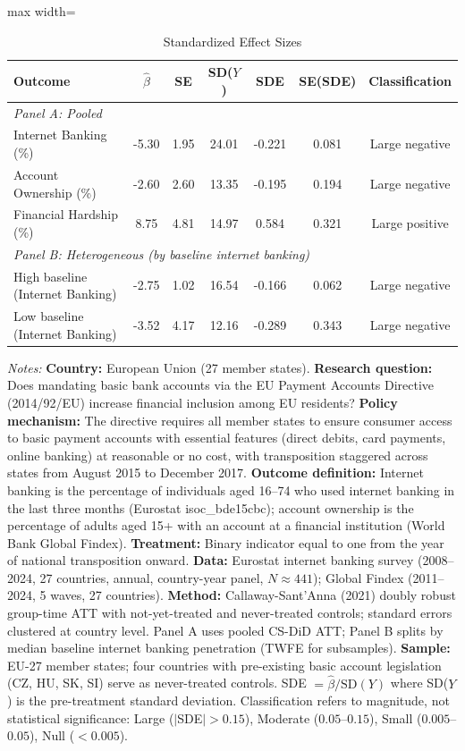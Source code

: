 \begin{table}[htbp]
\centering
\caption{Standardized Effect Sizes}
\label{tab:sde}
\begin{adjustbox}{max width=\textwidth}
\begin{tabular}{lcccccc}
\hline\hline
Outcome & $\hat{\beta}$ & SE & SD($Y$) & SDE & SE(SDE) & Classification \\
\hline
\multicolumn{7}{l}{\textit{Panel A: Pooled}} \\
Internet Banking (\%) & -5.30 & 1.95 & 24.01 & -0.221 & 0.081 & Large negative \\
Account Ownership (\%) & -2.60 & 2.60 & 13.35 & -0.195 & 0.194 & Large negative \\
Financial Hardship (\%) & 8.75 & 4.81 & 14.97 & 0.584 & 0.321 & Large positive \\
\hline
\multicolumn{7}{l}{\textit{Panel B: Heterogeneous (by baseline internet banking)}} \\
High baseline (Internet Banking) & -2.75 & 1.02 & 16.54 & -0.166 & 0.062 & Large negative \\
Low baseline (Internet Banking) & -3.52 & 4.17 & 12.16 & -0.289 & 0.343 & Large negative \\
\hline\hline
\end{tabular}
\end{adjustbox}
\begin{tablenotes}
\item \textit{Notes:} \textbf{Country:} European Union (27 member states). \textbf{Research question:} Does mandating basic bank accounts via the EU Payment Accounts Directive (2014/92/EU) increase financial inclusion among EU residents? \textbf{Policy mechanism:} The directive requires all member states to ensure consumer access to basic payment accounts with essential features (direct debits, card payments, online banking) at reasonable or no cost, with transposition staggered across states from August 2015 to December 2017. \textbf{Outcome definition:} Internet banking is the percentage of individuals aged 16--74 who used internet banking in the last three months (Eurostat isoc\_bde15cbc); account ownership is the percentage of adults aged 15+ with an account at a financial institution (World Bank Global Findex). \textbf{Treatment:} Binary indicator equal to one from the year of national transposition onward. \textbf{Data:} Eurostat internet banking survey (2008--2024, 27 countries, annual, country-year panel, $N \approx 441$); Global Findex (2011--2024, 5 waves, 27 countries). \textbf{Method:} Callaway-Sant'Anna (2021) doubly robust group-time ATT with not-yet-treated and never-treated controls; standard errors clustered at country level. Panel A uses pooled CS-DiD ATT; Panel B splits by median baseline internet banking penetration (TWFE for subsamples). \textbf{Sample:} EU-27 member states; four countries with pre-existing basic account legislation (CZ, HU, SK, SI) serve as never-treated controls. SDE $= \hat{\beta} / \text{SD}(Y)$ where SD($Y$) is the pre-treatment standard deviation. Classification refers to magnitude, not statistical significance: Large ($|$SDE$| > 0.15$), Moderate ($0.05$--$0.15$), Small ($0.005$--$0.05$), Null ($< 0.005$).
\end{tablenotes}
\end{table}
